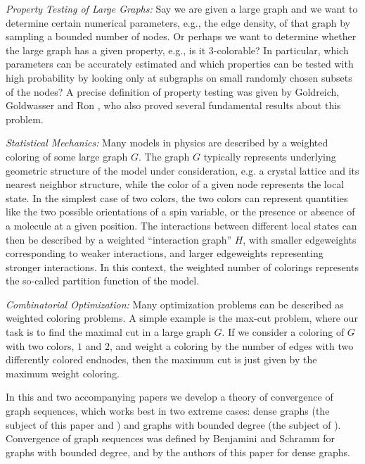\documentclass[12pt]{article}
\numberwithin{equation}{section}
\begin{document}
{\it Property Testing of Large Graphs:} Say we are given a large
graph and we want to determine certain numerical parameters, e.g.,
the edge density, of that graph by sampling a bounded number of
nodes. Or perhaps we want to determine whether the large graph has a
given property, e.g., is it 3-colorable?  In particular, which
parameters can be accurately estimated and which properties can be
tested with high probability by looking only at subgraphs on small
randomly chosen subsets of the nodes? A precise definition of
property testing was given by Goldreich, Goldwasser and Ron
\cite{GGR}, who also proved several fundamental results about this
problem.


{\it Statistical Mechanics:} Many models in physics are described by
a weighted coloring of some large graph $G$.  The graph $G$ typically
represents underlying geometric structure of the model under
consideration, e.g. a crystal lattice and its nearest neighbor
structure, while the color of a given node represents the local
state. In the simplest case of two colors, the two colors can
represent quantities like the two possible orientations of a spin
variable, or the presence or absence of a molecule at a given
position.  The interactions between different local states can then
be described by a weighted ``interaction graph'' $H$, with smaller
edgeweights corresponding to weaker interactions, and larger
edgeweights representing stronger interactions. In this context, the
weighted number of colorings represents the so-called partition
function of the model.

{\it Combinatorial Optimization:} Many optimization problems can be
described as weighted coloring problems. A simple example is the
max-cut problem, where our task is to find the maximal cut in a large
graph $G$. If we consider a coloring of $G$ with two colors, $1$ and
$2$, and weight a coloring by the number of edges with two
differently colored endnodes, then
the maximum cut is just given by the maximum weight coloring.




\medskip

In this and two accompanying papers we develop a theory of
convergence of  graph sequences, which works best in two extreme
cases: dense graphs (the subject of this paper and \cite{dense2}) and
graphs with bounded degree (the subject of \cite{sparse}).
Convergence of graph sequences was defined by Benjamini and Schramm
\cite{BS} for graphs with bounded degree, and by the authors of this
paper \cite{BCLSV-03} for dense graphs.
\end{document}
